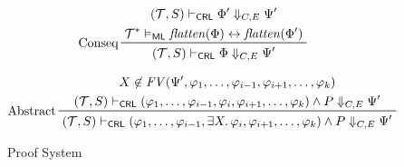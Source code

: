 \documentclass{article}
\newcommand{\ML}{\mathsf{ML}}
\newcommand{\CRL}{\mathsf{CRL}}
\begin{document}
\begin{figure}
    \begin{align*}
    & \prftree[l]{Conseq}
      { \prfStackPremises
        { (\mathcal{T}, S) \vdash_\CRL \Phi^\prime \Downarrow_{C, E} \Psi^\prime}
        { \mathcal{T}^* \vDash_\ML \mathit{flatten}(\Phi) \leftrightarrow \mathit{flatten}(\Phi^\prime) }
      }
      { (\mathcal{T}, S) \vdash_\CRL \Phi \Downarrow_{C, E} \Psi^\prime}
    \end{align*}

    \begin{align*}
    & \prftree[l]{Abstract}
      { \prfStackPremises
        { X \not\in \mathit{FV}(\Psi^\prime, \varphi_1, \ldots, \varphi_{i-1}, \varphi_{i+1}, \ldots,\varphi_k)
        }
        {(\mathcal{T}, S) \vdash_\CRL (\varphi_1, \ldots, \varphi_{i-1}, \varphi_i, \varphi_{i+1}, \ldots, \varphi_k) \land P \Downarrow_{C, E} \Psi^\prime}
      }
      {(\mathcal{T}, S) \vdash_\CRL (\varphi_1, \ldots, \varphi_{i-1}, \exists X.\, \varphi_i, \varphi_{i+1}, \ldots, \varphi_k) \land P \Downarrow_{C, E} \Psi^\prime}
    \end{align*}
    \caption{Proof System}
    \label{fig:my_label}
\end{figure}
\end{document}

